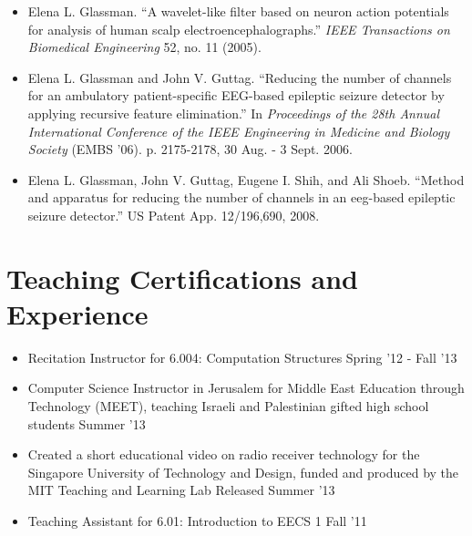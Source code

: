 \documentclass[margin]{res}
\begin{document}
\begin{resume}
\begin{itemize}
 
	\item Elena L. Glassman. ``A wavelet-like filter based on neuron action potentials for analysis of human scalp electroencephalographs.'' \textit{IEEE Transactions on Biomedical Engineering} 52, no. 11 (2005).

	\item Elena L. Glassman and John V. Guttag. ``Reducing the number of channels for an ambulatory patient-specific EEG-based epileptic seizure detector by applying recursive feature elimination.'' In \textit{Proceedings of the 28th Annual International Conference of the IEEE Engineering in Medicine and Biology Society} (EMBS '06). p. 2175-2178, 30 Aug. - 3 Sept. 2006.

\item Elena L. Glassman, John V. Guttag, Eugene I. Shih, and Ali Shoeb. ``Method and apparatus for reducing the number of channels in an eeg-based epileptic seizure detector.'' US Patent App. 12/196,690, 2008.


\end{itemize}
 
\section{Teaching Certifications and Experience}
\begin{itemize}
\item Recitation Instructor for 6.004: Computation Structures \hfill Spring '12 - Fall '13
\item Computer Science Instructor in Jerusalem for Middle East Education through Technology (MEET), teaching Israeli and Palestinian gifted high school students \hfill Summer '13
\item Created a short educational video on radio receiver technology for the Singapore University of Technology and Design, funded and produced by the MIT Teaching and Learning Lab \hfill Released Summer '13
\item Teaching Assistant for 6.01: Introduction to EECS 1 \hfill Fall '11


\end{itemize}
\end{resume}
\end{document}
